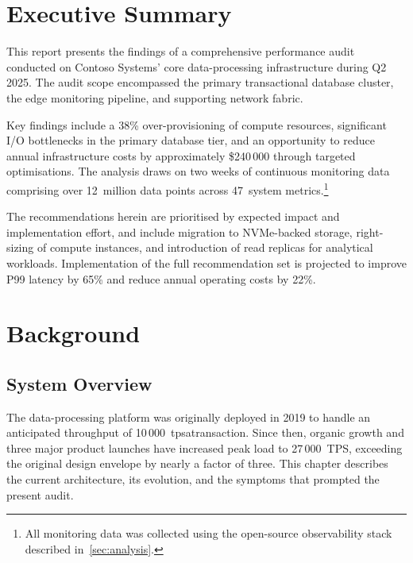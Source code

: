 \documentclass[
    language=english,
    doctype=technical-report,
    institution=none,
    titlestyle=book,
    oneside,
    loadGlossaries,
]{../../omnilatex}
\begin{document}
\maketitle

\tableofcontents
\listoffigures
\listoftables
\listofalgorithms

\chapter{Executive Summary}

This report presents the findings of a comprehensive performance audit
conducted on Contoso Systems' core data-processing infrastructure during
Q2 2025. The audit scope encompassed the primary transactional database
cluster, the edge monitoring pipeline, and supporting network fabric.

Key findings include a 38\% over-provisioning of compute resources,
significant I/O bottlenecks in the primary database tier, and an
opportunity to reduce annual infrastructure costs by approximately
\$240\,000 through targeted optimisations. The analysis draws on two
weeks of continuous monitoring data comprising over 12~million data points
across 47~system metrics.\footnote{All monitoring data was collected
using the open-source observability stack described
in~\cref{sec:analysis}.}

The recommendations herein are prioritised by expected impact and
implementation effort, and include migration to NVMe-backed storage,
right-sizing of compute instances, and introduction of read replicas for
analytical workloads. Implementation of the full recommendation set is
projected to improve P99 latency by 65\% and reduce annual operating
costs by 22\%.

\chapter{Background}

\section{System Overview}

The data-processing platform was originally deployed in 2019 to handle an
anticipated throughput of 10\,000~\gls{tpsatransaction}. Since then,
organic growth and three major product launches have increased peak load
to 27\,000~TPS, exceeding the original design envelope by nearly a factor
of three. This chapter describes the current architecture, its evolution,
and the symptoms that prompted the present audit.
\end{document}
